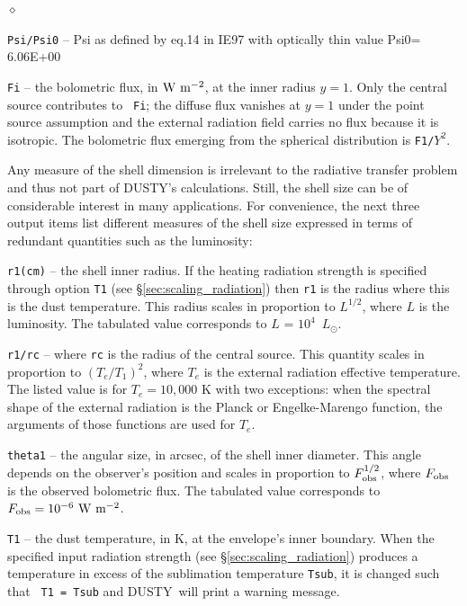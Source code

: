 \documentclass[11pt]{article}
\def\D    {{\sf DUSTY}}
\def\E#1{\hbox{$10^{#1}$}}
\def\Lo     {\hbox{$L_{\odot}$}}
\begin{document}
\begin{list}{$\diamond$}{}
\item {\tt Psi/Psi0} -- Psi as defined by eq.14 in IE97 with optically
  thin value Psi0= 6.06E+00
\item {\tt Fi} -- the bolometric flux, in $\rm W\ m^{-2}$, at the
  inner radius $y = 1$. Only the central source contributes to {\tt
    Fi}; the diffuse flux vanishes at $y = 1$ under the point source
  assumption and the external radiation field carries no flux because
  it is isotropic. The bolometric flux emerging from the spherical
  distribution is {\tt F1/$Y^2$}.

  Any measure of the shell dimension is irrelevant to the radiative
  transfer problem and thus not part of \D's calculations.  Still, the
  shell size can be of considerable interest in many applications. For
  convenience, the next three output items list different measures of
  the shell size expressed in terms of redundant quantities such as
  the luminosity:

\item {\tt r1(cm)} -- the shell inner radius. If the heating radiation
  strength is specified through option {\tt T1} (see
  \S\ref{sec:scaling_radiation}) then {\tt r1} is the radius where
  this is the dust temperature. This radius scales in proportion to
  $L^{1/2}$, where $L$ is the luminosity. The tabulated value
  corresponds to $L$ = \E4~\Lo.

\item {\tt r1/rc} -- where {\tt rc} is the radius of the central
  source.  This quantity scales in proportion to $(T_e/T_1)^2$, where
  $T_e$ is the external radiation effective temperature.  The listed
  value is for $T_e = 10,000$ K with two exceptions: when the spectral
  shape of the external radiation is the Planck or Engelke-Marengo
  function, the arguments of those functions are used for $T_e$.

\item {\tt theta1} -- the angular size, in arcsec, of the shell inner
  diameter.  This angle depends on the observer's position and scales
  in proportion to $F_{\rm obs}^{1/2}$, where $F_{\rm obs}$ is the
  observed bolometric flux.  The tabulated value corresponds to
  $F_{\rm obs} = \E{-6}\ \rm W\ m^{-2}$.

\item {\tt T1} -- the dust temperature, in K, at the envelope's inner
  boundary. When the specified input radiation strength (see
  \S\ref{sec:scaling_radiation}) produces a temperature in excess of
  the sublimation temperature {\tt Tsub}, it is changed such that {\tt
    T1 = Tsub} and \D\ will print a warning message.


\end{list}
\end{document}
